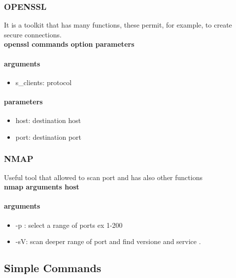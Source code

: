 \documentclass{article}
\begin{document}
                \subsubsection{OPENSSL}
                    It is a toolkit that has many functions, these permit, for example, to create secure connections. \\
                    \textbf{openssl commands option parameters}
                    \paragraph{arguments}
                    \begin{itemize}
                        \item s_clients: protocol
                    \end{itemize}
                    \paragraph{parameters}
                    \begin{itemize}
                        \item host: destination host
                        \item port: destination port
                    \end{itemize}
                \subsubsection{NMAP}
                    Useful tool that allowed to scan port and has also other functions\\
                    \textbf{nmap arguments host}
                    \paragraph{arguments}
                    \begin{itemize}
                        \item -p : select a range of ports ex 1-200
                        \item -sV: scan deeper range of port and find versione and service . 
                    \end{itemize}

    \subsection{Simple Commands}
\end{document}
